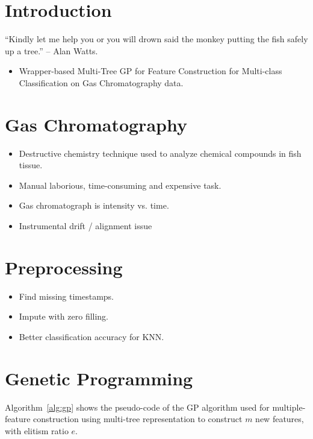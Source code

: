 \documentclass[runningheads]{llncs}
\begin{document}
\section{Introduction}

“Kindly let me help you or you will drown said the monkey putting the fish safely up a tree.” -- Alan Watts. 

\begin{itemize}
  \item Wrapper-based Multi-Tree GP for Feature Construction for Multi-class Classification on Gas Chromatography data.
\end{itemize}

\section{Gas Chromatography}

\begin{itemize}
  \item Destructive chemistry technique used to analyze chemical compounds in fish tissue. 
  \item Manual laborious, time-consuming and expensive task. 
  \item Gas chromatograph is intensity vs. time. 
  \item Instrumental drift / alignment issue
\end{itemize}

\section{Preprocessing}

\begin{itemize}
  \item Find missing timestamps.
  \item Impute with zero filling. 
  \item Better classification accuracy for KNN. 
\end{itemize}

\section{Genetic Programming}

Algorithm~\ref{alg:gp} shows the pseudo-code of the GP algorithm used for multiple-feature construction using multi-tree representation to construct $m$ new features, with elitism ratio $e$. 
\end{document}
